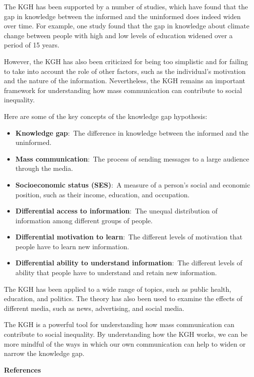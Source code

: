 \documentclass[
  b5paper]{book}
\begin{document}
The KGH has been supported by a number of studies, which have found that the gap in knowledge between the informed and the uninformed does indeed widen over time. For example, one study found that the gap in knowledge about climate change between people with high and low levels of education widened over a period of 15 years.

However, the KGH has also been criticized for being too simplistic and for failing to take into account the role of other factors, such as the individual's motivation and the nature of the information. Nevertheless, the KGH remains an important framework for understanding how mass communication can contribute to social inequality.

Here are some of the key concepts of the knowledge gap hypothesis:

\begin{itemize}
\item
  \textbf{Knowledge gap}:~The difference in knowledge between the informed and the uninformed.
\item
  \textbf{Mass communication}:~The process of sending messages to a large audience through the media.
\item
  \textbf{Socioeconomic status (SES)}:~A measure of a person's social and economic position, such as their income, education, and occupation.
\item
  \textbf{Differential access to information}:~The unequal distribution of information among different groups of people.
\item
  \textbf{Differential motivation to learn}:~The different levels of motivation that people have to learn new information.
\item
  \textbf{Differential ability to understand information}:~The different levels of ability that people have to understand and retain new information.
\end{itemize}

The KGH has been applied to a wide range of topics, such as public health, education, and politics. The theory has also been used to examine the effects of different media, such as news, advertising, and social media.

The KGH is a powerful tool for understanding how mass communication can contribute to social inequality. By understanding how the KGH works, we can be more mindful of the ways in which our own communication can help to widen or narrow the knowledge gap.

\textbf{References}
\end{document}
